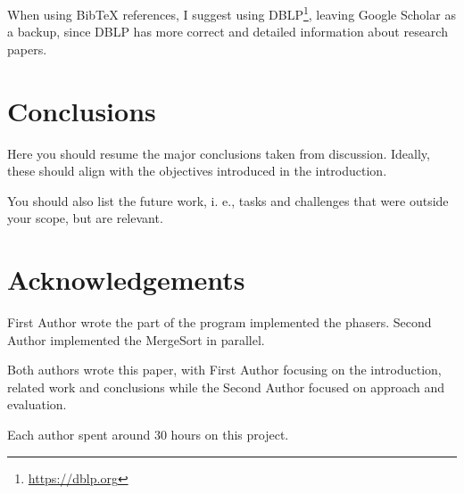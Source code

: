 \documentclass[runningheads]{llncs}
\begin{document}
When using BibTeX references, I suggest using DBLP\footnote{\url{https://dblp.org}}, leaving Google Scholar as a backup, since DBLP has more correct and detailed information about research papers.

\section{Conclusions}

Here you should resume the major conclusions taken from discussion. Ideally, these should align with the objectives introduced in the introduction.


You should also list the future work, i. e., tasks and challenges that were outside your scope, but are relevant.

\section*{Acknowledgements}

First Author wrote the part of the program implemented the phasers. Second Author implemented the MergeSort in parallel. 

Both authors wrote this paper, with First Author focusing on the introduction, related work and conclusions while the Second Author focused on approach and evaluation.

Each author spent around 30 hours on this project.



\end{document}
